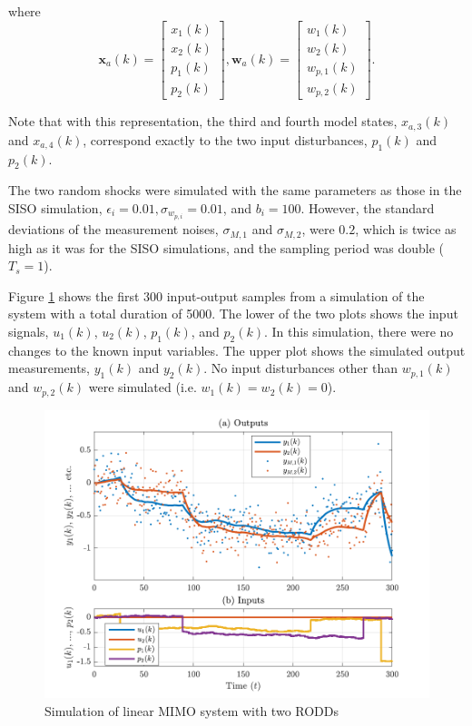 where
\begin{equation} \label{eq:sim-sys-2x2-ss-aug2}
	\mathbf{x}_{a}(k) = \left[\begin{array}{l}
		x_{1}(k) \\
		x_{2}(k) \\
		p_{1}(k) \\
		p_{2}(k)
	\end{array}\right], \mathbf{w}_{a}(k) = \left[\begin{array}{l}
		w_1(k) \\
		w_2(k) \\
		w_{p,1}(k) \\
		w_{p,2}(k)
	\end{array}\right].
\end{equation}

Note that with this representation, the third and fourth model states, $x_{a,3}(k)$ and $x_{a,4}(k)$, correspond exactly to the two input disturbances, $p_1(k)$ and $p_2(k)$.

The two random shocks were simulated with the same parameters as those in the SISO simulation, $\epsilon_i=0.01, \sigma_{w_{p,i}}=0.01$, and $b_i=100$. However, the standard deviations of the measurement noises, $\sigma_{M,1}$ and $\sigma_{M,2}$, were $0.2$, which is twice as high as it was for the SISO simulations, and the sampling period was double ($T_s=1$).

Figure \ref{fig:rod-obs-sim-2-ioplot} shows the first 300 input-output samples from a simulation of the system with a total duration of 5000. The lower of the two plots shows the input signals, $u_1(k)$, $u_2(k)$, $p_1(k)$, and $p_2(k)$. In this simulation, there were no changes to the known input variables. The upper plot shows the simulated output measurements, $y_1(k)$ and $y_2(k)$. No input disturbances other than $w_{p,1}(k)$ and $w_{p,2}(k)$ were simulated (i.e. $w_1(k)=w_2(k)=0$).
\begin{figure}[htp]
	\centering
	\includegraphics[width=13cm]{images/rod_obs_sim3_all_seed_ioplot.pdf}
	\caption{Simulation of linear MIMO system with two \gls{RODD}s}
	\label{fig:rod-obs-sim-2-ioplot}
\end{figure}

